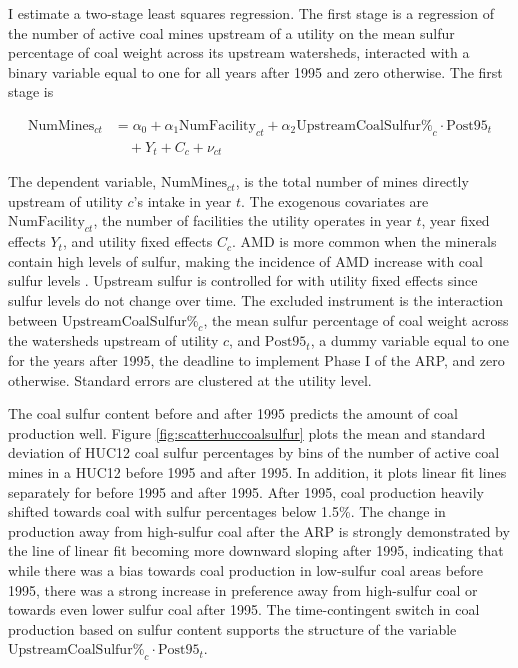 \documentclass[12pt]{article}
\begin{document}
I estimate a two-stage least squares regression. The first stage is a regression of the number of active coal mines upstream of a utility on the mean sulfur percentage of coal weight across its upstream watersheds, interacted with a binary variable equal to one for all years after 1995 and zero otherwise. The first stage is

\begin{equation}\label{1ststage2sls}
\begin{split}
\text{NumMines}_{ct} &= \alpha_0 + \alpha_1\text{NumFacility}_{ct} + \alpha_2\text{UpstreamCoalSulfur\%}_c \cdot \text{Post95}_t \\
&\quad + Y_t + C_c + \nu_{ct}
\end{split}
\end{equation}

The dependent variable, $\text{NumMines}_{ct}$, is the total number of mines directly upstream of utility $c$'s intake in year $t$. The exogenous covariates are $\text{NumFacility}_{ct}$, the number of facilities the utility operates in year $t$, year fixed effects $Y_t$, and utility fixed effects $C_c$. AMD is more common when the minerals contain high levels of sulfur, making the incidence of AMD increase with coal sulfur levels \parencite{schweinfurth2009introduction}. Upstream sulfur is controlled for with utility fixed effects since sulfur levels do not change over time. The excluded instrument is the interaction between $\text{UpstreamCoalSulfur\%}_c$, the mean sulfur percentage of coal weight across the watersheds upstream of utility $c$, and $\text{Post95}_t$, a dummy variable equal to one for the years after 1995, the deadline to implement Phase I of the ARP, and zero otherwise. Standard errors are clustered at the utility level. 

The coal sulfur content before and after 1995 predicts the amount of coal production well. Figure \ref{fig:scatterhuccoalsulfur} plots the mean and standard deviation of HUC12 coal sulfur percentages by bins of the number of active coal mines in a HUC12 before 1995 and after 1995. In addition, it plots linear fit lines separately for before 1995 and after 1995. After 1995, coal production heavily shifted towards coal with sulfur percentages below 1.5\%. The change in production away from high-sulfur coal after the ARP is strongly demonstrated by the line of linear fit becoming more downward sloping after 1995, indicating that while there was a bias towards coal production in low-sulfur coal areas before 1995, there was a strong increase in preference away from high-sulfur coal or towards even lower sulfur coal after 1995. The time-contingent switch in coal production based on sulfur content supports the structure of the variable $\text{UpstreamCoalSulfur\%}_c \cdot \text{Post95}_t$.
\end{document}

